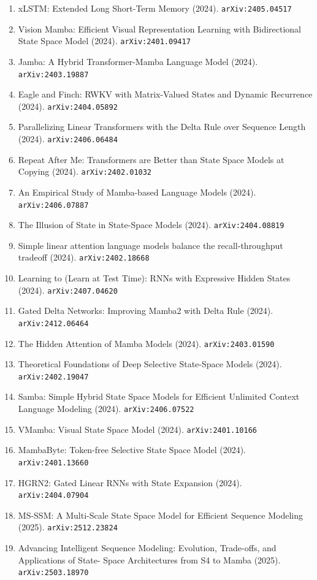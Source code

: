 \documentclass[11pt]{article}
\begin{document}
\begin{enumerate}
  \item xLSTM: Extended Long Short-Term Memory (2024). \texttt{arXiv:2405.04517}
  \item Vision Mamba: Efficient Visual Representation Learning with
  Bidirectional State Space Model (2024). \texttt{arXiv:2401.09417}
  \item Jamba: A Hybrid Transformer-Mamba Language Model (2024). \texttt{arXiv:2403.19887}
  \item Eagle and Finch: RWKV with Matrix-Valued States and Dynamic Recurrence (2024). \texttt{arXiv:2404.05892}
  \item Parallelizing Linear Transformers with the Delta Rule over Sequence
  Length (2024). \texttt{arXiv:2406.06484}
  \item Repeat After Me: Transformers are Better than State Space Models at
  Copying (2024). \texttt{arXiv:2402.01032}
  \item An Empirical Study of Mamba-based Language Models (2024). \texttt{arXiv:2406.07887}
  \item The Illusion of State in State-Space Models (2024). \texttt{arXiv:2404.08819}
  \item Simple linear attention language models balance the recall-throughput
  tradeoff (2024). \texttt{arXiv:2402.18668}
  \item Learning to (Learn at Test Time): RNNs with Expressive Hidden States (2024). \texttt{arXiv:2407.04620}
  \item Gated Delta Networks: Improving Mamba2 with Delta Rule (2024). \texttt{arXiv:2412.06464}
  \item The Hidden Attention of Mamba Models (2024). \texttt{arXiv:2403.01590}
  \item Theoretical Foundations of Deep Selective State-Space Models (2024). \texttt{arXiv:2402.19047}
  \item Samba: Simple Hybrid State Space Models for Efficient Unlimited Context
  Language Modeling (2024). \texttt{arXiv:2406.07522}
  \item VMamba: Visual State Space Model (2024). \texttt{arXiv:2401.10166}
  \item MambaByte: Token-free Selective State Space Model (2024). \texttt{arXiv:2401.13660}
  \item HGRN2: Gated Linear RNNs with State Expansion (2024). \texttt{arXiv:2404.07904}
  \item MS-SSM: A Multi-Scale State Space Model for Efficient Sequence Modeling (2025). \texttt{arXiv:2512.23824}
  \item Advancing Intelligent Sequence Modeling: Evolution, Trade-offs, and Applications of State- Space Architectures from S4 to Mamba (2025). \texttt{arXiv:2503.18970}

\end{enumerate}
\end{document}
